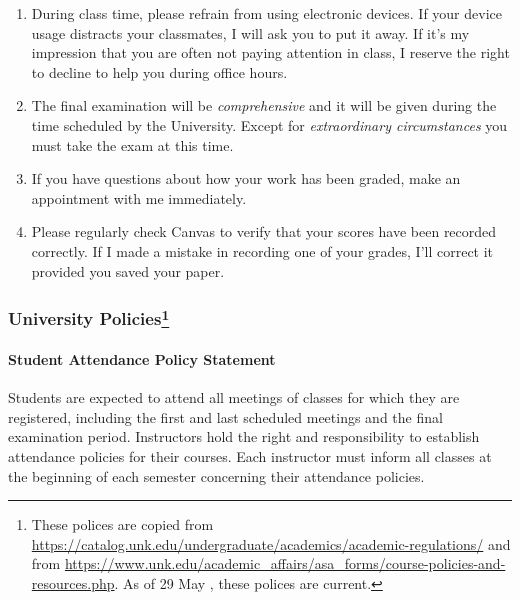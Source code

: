 \documentclass[12pt]{article}
\newcounter{ex}\setcounter{ex}{0}
\begin{document}
\begin{enumerate}
 

\item During class time, please refrain from using electronic devices. If your 
device usage distracts your classmates, I will ask you to put it away. If it's my 
impression that you are often not paying attention in class, I reserve the right to 
decline to help you during office hours.

\item The final examination will be \emph{comprehensive} and it will be given 
during the  time scheduled by the University. Except for \emph{extraordinary circumstances}
you must take the exam at this time.
 
\item If you have questions about how your work has been graded, make an appointment with me immediately.


\item Please regularly check Canvas  to verify that your scores have 
been recorded correctly.  If I made a mistake in recording one of
your grades, I'll correct it provided you saved your paper.



\end{enumerate}

















\newpage



\subsubsection*{University Policies\footnote{These polices are
copied from \url{https://catalog.unk.edu/undergraduate/academics/academic-regulations/}
and from \url{https://www.unk.edu/academic_affairs/asa_forms/course-policies-and-resources.php}.
As of 29 May \the\year, these polices are current.}} 
\paragraph*{Student Attendance Policy Statement}

Students are expected to attend all meetings of classes for which they are 
registered, including the first and last scheduled meetings and the final 
examination period. Instructors hold the right and responsibility to 
establish attendance policies for their courses. Each instructor must 
inform all classes at the beginning of each semester concerning their 
attendance policies.
\end{document}
